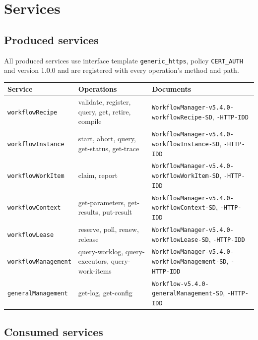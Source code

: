 \documentclass[a4paper]{arrowhead}
\begin{document}
\newpage
\section{Services}
\label{sec:services}
\subsection{Produced services}
All produced services use interface template \texttt{generic\_https}, policy \texttt{CERT\_AUTH} and version 1.0.0 and are
registered with every operation's method and path.

{\small
\begin{longtable}{|p{3.8cm}|p{6.2cm}|p{5.8cm}|}

\hline
\rowcolor{gray!33} Service & Operations & Documents \\ \hline
\endhead
\texttt{workflowRecipe} & validate, register, query, get, retire, compile & \texttt{WorkflowManager-v5.4.0-workflowRecipe-SD}, \texttt{-HTTP-IDD} \\ \hline
\texttt{workflowInstance} & start, abort, query, get-status, get-trace & \texttt{WorkflowManager-v5.4.0-workflowInstance-SD}, \texttt{-HTTP-IDD} \\ \hline
\texttt{workflowWorkItem} & claim, report & \texttt{WorkflowManager-v5.4.0-workflowWorkItem-SD}, \texttt{-HTTP-IDD} \\ \hline
\texttt{workflowContext} & get-parameters, get-results, put-result & \texttt{WorkflowManager-v5.4.0-workflowContext-SD}, \texttt{-HTTP-IDD} \\ \hline
\texttt{workflowLease} & reserve, poll, renew, release & \texttt{WorkflowManager-v5.4.0-workflowLease-SD}, \texttt{-HTTP-IDD} \\ \hline
\texttt{workflowManagement} & query-worklog, query-executors, query-work-items & \texttt{WorkflowManager-v5.4.0-workflowManagement-SD}, \texttt{-HTTP-IDD} \\ \hline
\texttt{generalManagement} & get-log, get-config & \texttt{Workflow-v5.4.0-generalManagement-SD}, \texttt{-HTTP-IDD} \\ \hline
\end{longtable}
}

\subsection{Consumed services}
\end{document}
